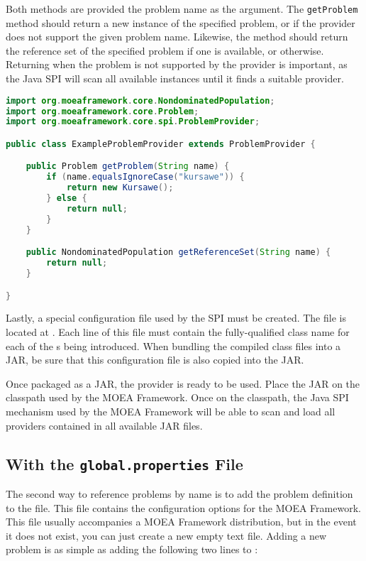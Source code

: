 Both methods are provided the problem name as the argument.  The \texttt{getProblem} method should return a new instance of the specified problem, or  if the provider does not support the given problem name.  Likewise, the  method should return the reference set of the specified problem if one is available, or  otherwise.  Returning  when the problem is not supported by the provider is important, as the Java SPI will scan all available  instances until it finds a suitable provider.

\begin{lstlisting}[language=Java]
import org.moeaframework.core.NondominatedPopulation;
import org.moeaframework.core.Problem;
import org.moeaframework.core.spi.ProblemProvider;

public class ExampleProblemProvider extends ProblemProvider {

	public Problem getProblem(String name) {
		if (name.equalsIgnoreCase("kursawe")) {
			return new Kursawe();
		} else {
			return null;
		}
	}

	public NondominatedPopulation getReferenceSet(String name) {
		return null;
	}

}
\end{lstlisting}

Lastly, a special configuration file used by the SPI must be created.  The file is located at .  Each line of this file must contain the fully-qualified class name for each of the s being introduced.  When bundling the compiled class files into a JAR, be sure that this configuration file is also copied into the JAR.

Once packaged as a JAR, the provider is ready to be used.  Place the JAR on the classpath used by the MOEA Framework.  Once on the classpath, the Java SPI mechanism used by the MOEA Framework will be able to scan and load all providers contained in all available JAR files.

\subsection{With the \texttt{global.properties} File}
The second way to reference problems by name is to add the problem definition to the  file.  This  file contains the configuration options for the MOEA Framework.  This file usually accompanies a MOEA Framework distribution, but in the event it does not exist, you can just create a new empty text file.  Adding a new problem is as simple as adding the following two lines to :

